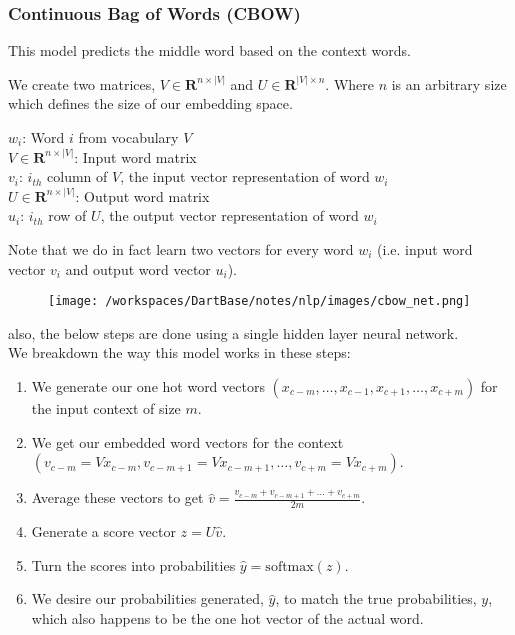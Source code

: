 \documentclass[12pt]{article}
\newcommand{\bold}[1]{\textbf{#1}}
\begin{document}
        \subsubsection{Continuous Bag of Words (CBOW)}
            This model predicts the middle word based on the context words.
            
            We create two matrices, $V \in \bold{R}^{n \times |V|}$ and $U \in \bold{R}^{|V| \times n}$. Where $n$ is an arbitrary size which defines the size of our embedding space.
            \begin{mdframed}
            $w_i$: Word $i$ from vocabulary $V$ \\
            $V \in \bold{R}^{n \times |V|}$: Input word matrix \\
            $v_i$: $i_{th}$ column of $V$, the input vector representation of word $w_i$\\
            $U \in \bold{R}^{n \times |V|}$: Output word matrix\\
            $u_i$: $i_{th}$ row of $U$, the output vector representation of word $w_i$
            \end{mdframed}
            Note that we do in fact learn two vectors for every word $w_i$ (i.e. input word vector $v_i$ and output word vector $u_i$).
            \begin{figure}[h]
                \centering
                \texttt{[image: /workspaces/DartBase/notes/nlp/images/cbow\_net.png]}
            \end{figure}
            also, the below steps are done using a single hidden layer neural network.\\
            We breakdown the way this model works in these steps:
            \begin{enumerate}
                \item We generate our one hot word vectors $(x_{c-m}, \ldots, x_{c-1}, x_{c+1}, \ldots, x_{c+m})$ for the input context of size $m$.
                \item We get our embedded word vectors for the context  \\
                $(v_{c-m} = Vx_{c-m}, v_{c-m+1} = Vx_{c-m+1}, \ldots, v_{c+m} = Vx_{c+m})$.
                \item Average these vectors to get $\hat{v} = \frac{v_{c-m} + v_{c-m+1} + \ldots + v_{c+m}}{2m}$.
                \item Generate a score vector $z = U\hat{v}$.
                \item Turn the scores into probabilities $\hat{y} = \text{softmax}(z)$.
                \item We desire our probabilities generated, $\hat{y}$, to match the true probabilities, $y$, which also happens to be the one hot vector of the actual word.
            \end{enumerate}
            
\end{document}
